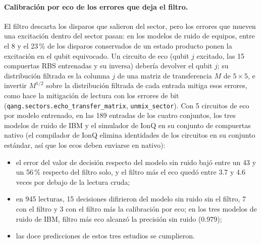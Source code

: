 \documentclass[11pt]{article}
\begin{document}
\paragraph{Calibración por eco de los errores que deja el filtro.}\label{sec:eco} El filtro descarta los disparos que
salieron del sector, pero los errores que mueven una excitación dentro del sector pasan: en los modelos de ruido de
equipos, entre el 8 y el 23\,\% de los disparos conservados de un estado producto ponen la excitación en el qubit
equivocado. Un circuito de eco (qubit $j$ excitado, las 15 compuertas RBS entrenadas y su inversa) debería devolver el
qubit $j$; su distribución filtrada es la columna $j$ de una matriz de transferencia $M$ de $5\times5$, e invertir
$M^{1/2}$ sobre la distribución filtrada de cada entrada mitiga esos errores, como hace la mitigación de lectura con
los errores de bit (\texttt{qang.sectors.echo\_transfer\_matrix}, \texttt{unmix\_sector}). Con 5 circuitos de eco por
modelo entrenado, en las 189 entradas de los cuatro conjuntos, los tres modelos de ruido de IBM y el simulador de IonQ
en su conjunto de compuertas nativo (el compilador de IonQ elimina identidades de los circuitos en su conjunto
estándar, así que los ecos deben enviarse en nativo):
\begin{itemize}
\item el error del valor de decisión respecto del modelo sin ruido bajó entre un 43 y un 56\,\% respecto del filtro
  solo, y el filtro más el eco quedó entre 3.7 y 4.6 veces por debajo de la lectura cruda;
\item en 945 lecturas, 15 decisiones difirieron del modelo sin ruido sin el filtro, 7 con el filtro y 3 con el filtro
  más la calibración por eco; en los tres modelos de ruido de IBM, filtro más eco alcanzó la precisión sin ruido
  (0.979);
\item las doce predicciones de estos tres estudios se cumplieron.
\end{itemize}
\end{document}
